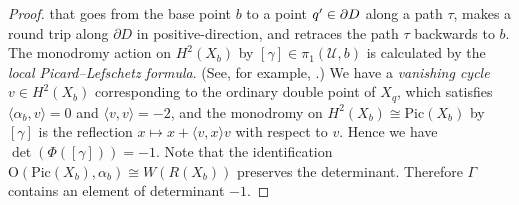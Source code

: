 \documentclass{math}
\theoremstyle{plain}
\numberwithin{equation}{section}
\newcommand{\UUU}{\mathord{\mathcal U}}
\newcommand{\sprime}{\sp{\prime}}
\newcommand{\OG}{\mathord{\mathrm{O}}}
\newcommand{\pione}{\pi_1}
\newcommand{\intf}[1]{\langle #1 \rangle}
\newcommand{\Pic}{\mathrm{Pic}}
\newcommand{\mon}{\Phi}
\begin{document}
\begin{proof}
that goes from the base point $b$ to a point $q\sprime\in \partial D$ along a path $\tau$,
makes a round trip along $\partial D$ in  positive-direction,
and retraces  the  path $\tau$ backwards to $b$.
The monodromy action on $H^2(X_b)$ by   $[\gamma]\in \pione(\UUU, b)$ is calculated by
the \emph{local Picard--Lefschetz formula}.
(See, for example, \cite{Lamotke1981}.)
We have  a \emph{vanishing cycle} $v\in H^2(X_b)$
corresponding to the ordinary double point of $X_q$,
which satisfies $\intf{ \alpha_b, v} =0$ and $\intf{v, v} =-2$,
and the monodromy  on $H^2(X_b)\cong \Pic(X_b)$ by $[\gamma]$ is the reflection $x\mapsto x+\intf{v, x}v$
with respect to $v$.
Hence we have $\det(\mon([\gamma]))=-1$. 
Note that the identification $\OG(\Pic(X_b), \alpha_b)\cong W(R(X_b))$ 
preserves the determinant.
Therefore $\Gamma$  contains an element of determinant $-1$.
%
%
\end{proof}
%
%
\end{document}
